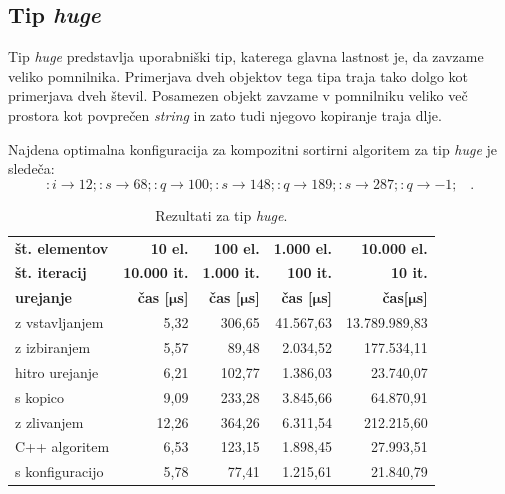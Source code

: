 \documentclass[a4paper,oneside,12pt]{article}
\newcommand{\lra}{\ensuremath{\longrightarrow}}
\newcommand{\edot}{\;\;\;.}
\newcommand{\bmu}{\ensuremath{\boldsymbol{\mu}}}
\newcommand{\usec}{\ensuremath{\bmu}s}
\begin{document}
\subsection{Tip \emph{huge}}
\label{chapter:rez:huge}
Tip \emph{huge} predstavlja uporabniški tip, katerega glavna lastnost je, da zavzame veliko pomnilnika.
Primerjava dveh objektov tega tipa traja tako dolgo kot primerjava dveh števil. Posamezen objekt
zavzame v pomnilniku veliko več prostora kot povprečen \emph{string} in zato tudi njegovo kopiranje 
traja dlje.

Najdena optimalna konfiguracija za kompozitni sortirni algoritem za tip \emph{huge} je sledeča:
\[ :i \lra 12;:s \lra 68;:q \lra 100;:s \lra 148;:q \lra 189;:s \lra 287;:q \lra -1; \edot \]

\begin{table}[h!]
  \centering
  \caption{Rezultati za tip \emph{huge}.}
  \label{tab:rez:huge} \vspace{1ex}
  \begin{tabular}{l!{\vrule width 1pt}r|r|r|r}
    \bf št. elementov  & \bf 10 el.& \bf 100 el.& \bf 1.000 el. & \bf 10.000 el. \\ 
    \bf št. iteracij   & \bf 10.000 it. & \bf 1.000 it. & \bf 100 it. & \bf 10 it. \\ \hline
    \bf urejanje       & \bf čas [\usec] & \bf čas [\usec] & \bf čas [\usec] & \bf čas[\usec] \\  
    z vstavljanjem     &  5,32 & 306,65 & 41.567,63 & 13.789.989,83 \\ \hline
    z izbiranjem       &  5,57 &  89,48 &  2.034,52 &    177.534,11 \\ \hline
    hitro urejanje     &  6,21 & 102,77 &  1.386,03 &     23.740,07 \\ \hline
    s kopico           &  9,09 & 233,28 &  3.845,66 &     64.870,91 \\ \hline
    z zlivanjem        & 12,26 & 364,26 &  6.311,54 &    212.215,60 \\ \hline
    C++ algoritem      &  6,53 & 123,15 &  1.898,45 &     27.993,51 \\ \hline
    s konfiguracijo    &  5,78 &  77,41 &  1.215,61 &     21.840,79 \\ 
  \end{tabular}
\end{table}
\end{document}
